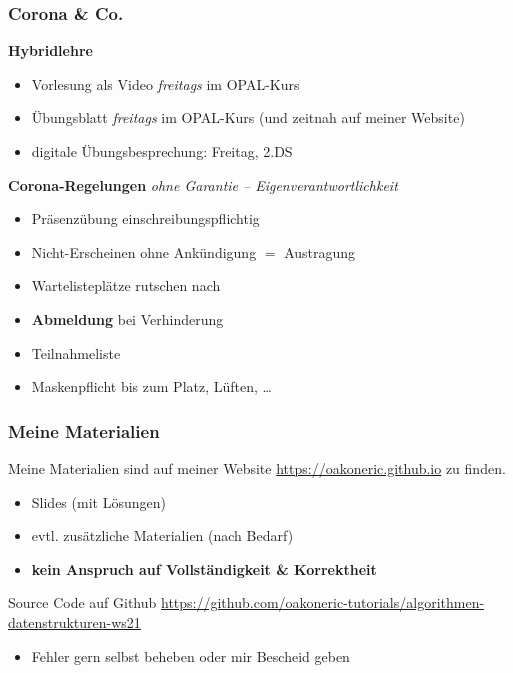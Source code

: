 \documentclass{beamer}
\begin{document}
	\begin{frame} \frametitle{Corona \& Co.}
		\textbf{Hybridlehre}
		\begin{itemize}
			\item Vorlesung als Video \textit{freitags} im OPAL-Kurs
			\item Übungsblatt \textit{freitags} im OPAL-Kurs (und zeitnah auf meiner Website)
			\item digitale Übungsbesprechung: Freitag, 2.DS
		\end{itemize}
	
		\textbf{Corona-Regelungen} {\tiny \itshape ohne Garantie -- Eigenverantwortlichkeit}
		\begin{itemize}
			\item Präsenzübung einschreibungspflichtig
			\item Nicht-Erscheinen ohne Ankündigung $=$ Austragung
			\item Wartelisteplätze rutschen nach
			\item \alert{\textbf{Abmeldung} bei Verhinderung}
			\item Teilnahmeliste
			\item Maskenpflicht bis zum Platz, Lüften, \dots
		\end{itemize}
	\end{frame}

	\begin{frame} \frametitle{Meine Materialien}
		Meine Materialien sind auf meiner Website \url{https://oakoneric.github.io} zu finden.
		\begin{itemize}
			\item Slides (mit Lösungen)
			\item evtl. zusätzliche Materialien (nach Bedarf)
			\item \alert{\textbf{kein Anspruch auf Vollständigkeit \& Korrektheit}}
		\end{itemize}
	
		Source Code auf Github
		\url{https://github.com/oakoneric-tutorials/algorithmen-datenstrukturen-ws21}
		
		\begin{itemize}
			\item Fehler gern selbst beheben oder mir Bescheid geben
		\end{itemize}
	\end{frame}
\end{document}
